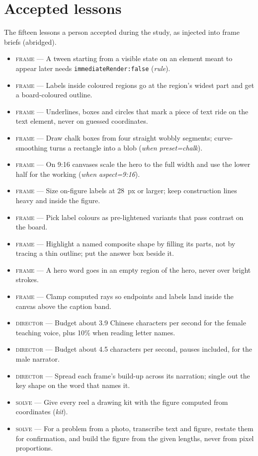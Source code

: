 \documentclass[11pt]{article}
\begin{document}
\section{Accepted lessons}
\label{app:lessons}
The fifteen lessons a person accepted during the study, as injected into frame briefs (abridged).
\begin{itemize}
\item \textsc{frame} --- A tween starting from a visible state on an element meant to appear later needs \texttt{immediateRender:false} (\emph{rule}).
\item \textsc{frame} --- Labels inside coloured regions go at the region's widest part and get a board-coloured outline.
\item \textsc{frame} --- Underlines, boxes and circles that mark a piece of text ride on the text element, never on guessed coordinates.
\item \textsc{frame} --- Draw chalk boxes from four straight wobbly segments; curve-smoothing turns a rectangle into a blob (\emph{when preset=chalk}).
\item \textsc{frame} --- On 9:16 canvases scale the hero to the full width and use the lower half for the working (\emph{when aspect=9:16}).
\item \textsc{frame} --- Size on-figure labels at 28~px or larger; keep construction lines heavy and inside the figure.
\item \textsc{frame} --- Pick label colours as pre-lightened variants that pass contrast on the board.
\item \textsc{frame} --- Highlight a named composite shape by filling its parts, not by tracing a thin outline; put the answer box beside it.
\item \textsc{frame} --- A hero word goes in an empty region of the hero, never over bright strokes.
\item \textsc{frame} --- Clamp computed rays so endpoints and labels land inside the canvas above the caption band.
\item \textsc{director} --- Budget about 3.9 Chinese characters per second for the female teaching voice, plus 10\% when reading letter names.
\item \textsc{director} --- Budget about 4.5 characters per second, pauses included, for the male narrator.
\item \textsc{director} --- Spread each frame's build-up across its narration; single out the key shape on the word that names it.
\item \textsc{solve} --- Give every reel a drawing kit with the figure computed from coordinates (\emph{kit}).
\item \textsc{solve} --- For a problem from a photo, transcribe text and figure, restate them for confirmation, and build the figure from the given lengths, never from pixel proportions.
\end{itemize}
\end{document}
